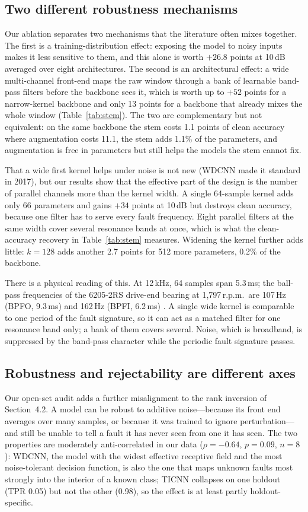 \subsection{Two different robustness mechanisms}
Our ablation separates two mechanisms that the literature often mixes together. The first is a training-distribution effect: exposing the model to noisy inputs makes it less sensitive to them, and this alone is worth $+26.8$ points at 10\,dB averaged over eight architectures. The second is an architectural effect: a wide multi-channel front-end maps the raw window through a bank of learnable band-pass filters before the backbone sees it, which is worth up to $+52$ points for a narrow-kernel backbone and only 13 points for a backbone that already mixes the whole window (Table~\ref{tab:stem}). The two are complementary but not equivalent: on the same backbone the stem costs 1.1 points of clean accuracy where augmentation costs 11.1, the stem adds 1.1\% of the parameters, and augmentation is free in parameters but still helps the models the stem cannot fix.

That a wide first kernel helps under noise is not new (WDCNN made it standard in 2017), but our results show that the effective part of the design is the number of parallel channels more than the kernel width. A single 64-sample kernel adds only 66 parameters and gains $+34$ points at 10\,dB but destroys clean accuracy, because one filter has to serve every fault frequency. Eight parallel filters at the same width cover several resonance bands at once, which is what the clean-accuracy recovery in Table~\ref{tab:stem} measures. Widening the kernel further adds little: $k=128$ adds another 2.7 points for 512 more parameters, 0.2\% of the backbone.

There is a physical reading of this. At 12\,kHz, 64 samples span 5.3\,ms; the ball-pass frequencies of the 6205-2RS drive-end bearing at 1{,}797\,r.p.m.\ are 107\,Hz (BPFO, 9.3\,ms) and 162\,Hz (BPFI, 6.2\,ms) \citep{randall2011tutorial}. A single wide kernel is comparable to one period of the fault signature, so it can act as a matched filter for one resonance band only; a bank of them covers several. Noise, which is broadband, is suppressed by the band-pass character while the periodic fault signature passes.

\subsection{Robustness and rejectability are different axes}
Our open-set audit adds a further misalignment to the rank inversion of Section~4.2. A model can be robust to additive noise---because its front end averages over many samples, or because it was trained to ignore perturbation---and still be unable to tell a fault it has never seen from one it has seen. The two properties are moderately anti-correlated in our data ($\rho=-0.64$, $p=0.09$, $n=8$): WDCNN, the model with the widest effective receptive field and the most noise-tolerant decision function, is also the one that maps unknown faults most strongly into the interior of a known class; TICNN collapses on one holdout (TPR 0.05) but not the other (0.98), so the effect is at least partly holdout-specific.

